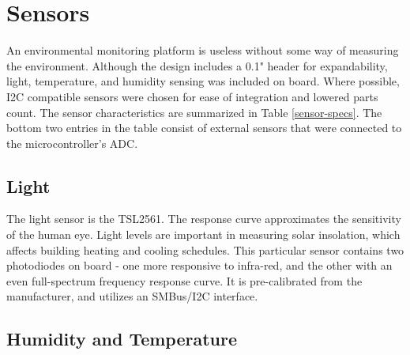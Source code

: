 \section{Sensors}

An environmental monitoring platform is useless without some way of measuring the environment. Although the design includes a 0.1" header for expandability, light, temperature, and humidity sensing was included on board. Where possible, I2C compatible sensors were chosen for ease of integration and lowered parts count. The sensor characteristics are summarized in Table \ref{sensor-specs}. The bottom two entries in the table consist of external sensors that were connected to the microcontroller's ADC. 

\begin{table}[h]
\caption{Sensor specifications}
\label{sensor-specs}
\end{table}

\subsection{Light}

The light sensor is the TSL2561. The response curve approximates the sensitivity of the human eye. Light levels are important in measuring solar insolation, which affects building heating and cooling schedules. This particular sensor contains two photodiodes on board - one more responsive to infra-red, and the other with an even full-spectrum frequency response curve. It is pre-calibrated from the manufacturer, and utilizes an SMBus/I2C interface.

\subsection{Humidity and Temperature}

